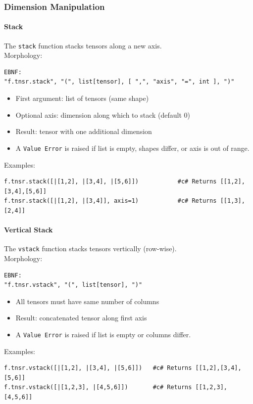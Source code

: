 \subsubsection{Dimension Manipulation}

\paragraph{Stack}
The \texttt{stack} function stacks tensors along a new axis.\\
Morphology:
\begin{verbatim}
EBNF:
"f.tnsr.stack", "(", list[tensor], [ ",", "axis", "=", int ], ")"
\end{verbatim}
\begin{itemize}
\item First argument: list of tensors (same shape)
\item Optional axis: dimension along which to stack (default 0)
\item Result: tensor with one additional dimension
\item A \texttt{Value Error} is raised if list is empty, shapes differ, or axis is out of range.
\end{itemize}
Examples:
\begin{verbatim}
f.tnsr.stack([|[1,2], |[3,4], |[5,6]])           #c# Returns [[1,2],[3,4],[5,6]]
f.tnsr.stack([|[1,2], |[3,4]], axis=1)           #c# Returns [[1,3],[2,4]]
\end{verbatim}

\paragraph{Vertical Stack}
The \texttt{vstack} function stacks tensors vertically (row-wise).\\
Morphology:
\begin{verbatim}
EBNF:
"f.tnsr.vstack", "(", list[tensor], ")"
\end{verbatim}
\begin{itemize}
\item All tensors must have same number of columns
\item Result: concatenated tensor along first axis
\item A \texttt{Value Error} is raised if list is empty or columns differ.
\end{itemize}
Examples:
\begin{verbatim}
f.tnsr.vstack([|[1,2], |[3,4], |[5,6]])   #c# Returns [[1,2],[3,4],[5,6]]
f.tnsr.vstack([|[1,2,3], |[4,5,6]])       #c# Returns [[1,2,3],[4,5,6]]
\end{verbatim}

